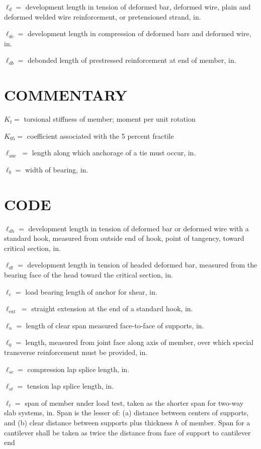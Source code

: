\documentclass[10pt]{article}
\begin{document}
$\ell_{d}=$ development length in tension of deformed bar, deformed wire, plain and deformed welded wire reinforcement, or pretensioned strand, in.

$\ell_{d c}=$ development length in compression of deformed bars and deformed wire, in.

$\ell_{d b}=$ debonded length of prestressed reinforcement at end of member, in.

\section*{COMMENTARY}
$K_{t}=$ torsional stiffness of member; moment per unit rotation

$K_{05}=$ coefficient associated with the 5 percent fractile

$\ell_{\text {anc }}=$ length along which anchorage of a tie must occur, in.

$\ell_{b}=$ width of bearing, in.

\section*{CODE}
$\ell_{d h}=$ development length in tension of deformed bar or deformed wire with a standard hook, measured from outside end of hook, point of tangency, toward critical section, in.

$\ell_{d t}=$ development length in tension of headed deformed bar, measured from the bearing face of the head toward the critical section, in.

$\ell_{e}=$ load bearing length of anchor for shear, in.

$\ell_{\text {ext }}=$ straight extension at the end of a standard hook, in.

$\ell_{n}=$ length of clear span measured face-to-face of supports, in.

$\ell_{0}=$ length, measured from joint face along axis of member, over which special transverse reinforcement must be provided, in.

$\ell_{s c}=$ compression lap splice length, in.

$\ell_{s t}=$ tension lap splice length, in.

$\ell_{t}=$ span of member under load test, taken as the shorter span for two-way slab systems, in. Span is the lesser of: (a) distance between centers of supports, and (b) clear distance between supports plus thickness $h$ of member. Span for a cantilever shall be taken as twice the distance from face of support to cantilever end
\end{document}
